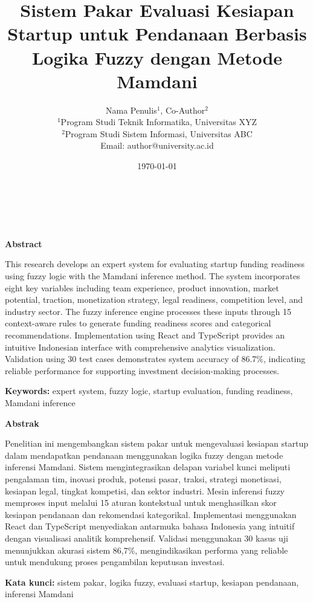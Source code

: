 \documentclass[12pt,a4paper]{article}
\title{Sistem Pakar Evaluasi Kesiapan Startup untuk Pendanaan Berbasis Logika Fuzzy dengan Metode Mamdani}
\author{%
    \small Nama Penulis$^{1}$, Co-Author$^{2}$\\
    \small $^{1}$Program Studi Teknik Informatika, Universitas XYZ\\
    \small $^{2}$Program Studi Sistem Informasi, Universitas ABC\\
    \small Email: author@university.ac.id
}
\date{\small \today}
\makeatletter
\renewcommand{\maketitle}{
    \begin{center}
        {\Large\textbf{\@title}}\\[0.3cm]
        {\normalsize\@author}\\[0.2cm]
        {\small\@date}
    \end{center}
}
\makeatother
\begin{document}
\maketitle

\begin{center}
    \textbf{Abstract}
\end{center}

\noindent This research develops an expert system for evaluating startup funding readiness using fuzzy logic with the Mamdani inference method. The system incorporates eight key variables including team experience, product innovation, market potential, traction, monetization strategy, legal readiness, competition level, and industry sector. The fuzzy inference engine processes these inputs through 15 context-aware rules to generate funding readiness scores and categorical recommendations. Implementation using React and TypeScript provides an intuitive Indonesian interface with comprehensive analytics visualization. Validation using 30 test cases demonstrates system accuracy of 86.7\%, indicating reliable performance for supporting investment decision-making processes.

\textbf{Keywords:} expert system, fuzzy logic, startup evaluation, funding readiness, Mamdani inference

\begin{center}
    \textbf{Abstrak}
\end{center}

\noindent Penelitian ini mengembangkan sistem pakar untuk mengevaluasi kesiapan startup dalam mendapatkan pendanaan menggunakan logika fuzzy dengan metode inferensi Mamdani. Sistem mengintegrasikan delapan variabel kunci meliputi pengalaman tim, inovasi produk, potensi pasar, traksi, strategi monetisasi, kesiapan legal, tingkat kompetisi, dan sektor industri. Mesin inferensi fuzzy memproses input melalui 15 aturan kontekstual untuk menghasilkan skor kesiapan pendanaan dan rekomendasi kategorikal. Implementasi menggunakan React dan TypeScript menyediakan antarmuka bahasa Indonesia yang intuitif dengan visualisasi analitik komprehensif. Validasi menggunakan 30 kasus uji menunjukkan akurasi sistem 86,7\%, mengindikasikan performa yang reliable untuk mendukung proses pengambilan keputusan investasi.

\textbf{Kata kunci:} sistem pakar, logika fuzzy, evaluasi startup, kesiapan pendanaan, inferensi Mamdani

\newpage
\end{document}

